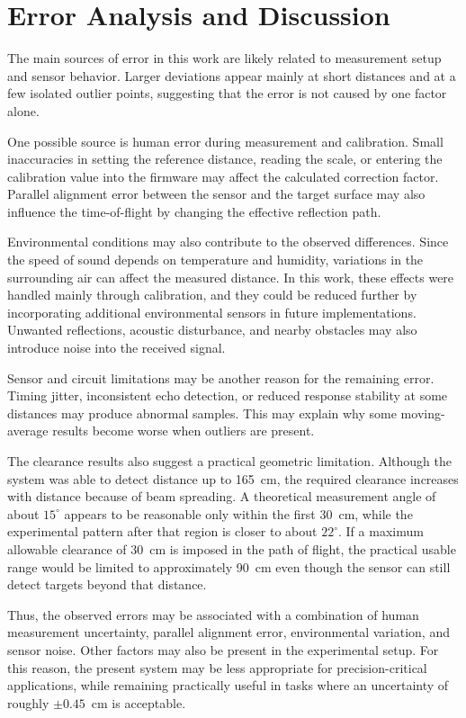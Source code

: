 \section{Error Analysis and Discussion}
The main sources of error in this work are likely related to
measurement setup and sensor behavior. Larger
deviations appear mainly at short distances and at a few isolated
outlier points, suggesting that the error is not caused by one factor
alone.

One possible source is human error during measurement and calibration.
Small inaccuracies in setting the reference distance, reading the scale,
or entering the calibration value into the firmware may affect the
calculated correction factor. Parallel alignment error between the
sensor and the target surface may also influence the time-of-flight by
changing the effective reflection path.

Environmental conditions may also contribute to the observed
differences. Since the speed of sound depends on temperature and
humidity, variations in the surrounding air can affect the measured
distance. In this work, these effects were handled mainly through
calibration, and they could be reduced further by incorporating
additional environmental sensors in future implementations. Unwanted
reflections, acoustic disturbance, and nearby obstacles may also
introduce noise into the received signal.

Sensor and circuit limitations may be another reason for the remaining
error. Timing jitter, inconsistent echo detection, or reduced response
stability at some distances may produce abnormal samples. This may
explain why some moving-average results become worse when outliers are
present.

The clearance results also suggest a practical geometric limitation.
Although the system was able to detect distance up to 165~cm, the
required clearance increases with distance because of beam spreading. A
theoretical measurement angle of about $15^\circ$ appears to be
reasonable only within the first 30~cm, while the experimental pattern
after that region is closer to about $22^\circ$. If a maximum allowable
clearance of 30~cm is imposed in the path of flight, the practical
usable range would be limited to approximately 90~cm even though the
sensor can still detect targets beyond that distance.

Thus, the observed errors may be associated with a combination of human
measurement uncertainty, parallel alignment error, environmental
variation, and sensor noise. Other factors may also be present in the
experimental setup. For this reason, the present system may be less
appropriate for precision-critical applications, while remaining
practically useful in tasks where an uncertainty of roughly
$\pm 0.45$~cm is acceptable.
